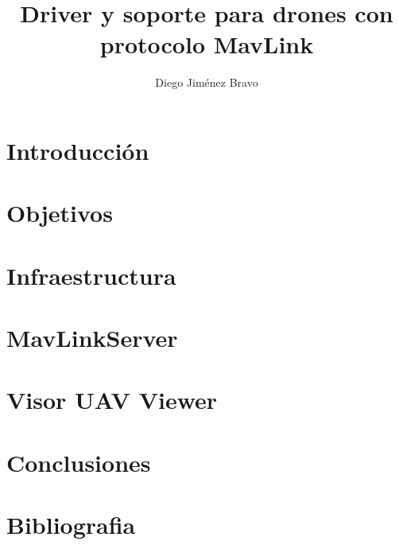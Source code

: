 \documentclass{new_cit_thesis}
\begin{document}
\title{Driver y soporte para drones con protocolo MavLink}
\author{Diego Jiménez Bravo}
\address{Tutor: Jose Maria Cañas Plaza} 
\copyyear{\the\year}                               
\pubnum{}                                          
\dedication{}  		   


\maketitle
\cleardoublepage


\cleardoublepage


\cleardoublepage


\cleardoublepage


\cleardoublepage
\pagestyle{plain}
\chapter{Introducción}


\cleardoublepage
\chapter{Objetivos}


\cleardoublepage
\chapter{Infraestructura}


\cleardoublepage
\chapter{MavLinkServer}


\cleardoublepage
\chapter{Visor UAV Viewer}


\cleardoublepage
\chapter{Conclusiones}


\cleardoublepage
\chapter{Bibliografia}

\end{document}
